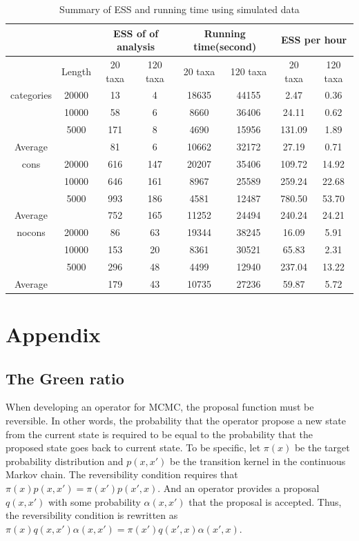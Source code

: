 \documentclass{bmcart}
\begin{document}
\begin{backmatter}
\begin{table}[h!]
  \centering
\begin{tabular}{cc|cc|cc|cc}
\hline
&&\multicolumn{2}{c|}{ESS of of analysis}&\multicolumn{2}{c|}{Running time(second)}&\multicolumn{2}{c}{ESS per hour}\\
\hline
&Length&20 taxa&120 taxa&20 taxa&120 taxa&20 taxa&120 taxa\\
categories&20000&13&4&18635&44155&2.47&0.36\\
&10000&58&6&8660&36406&24.11&0.62\\
&5000&171&8&4690&15956&131.09&1.89\\
Average&&81&6&10662&32172&27.19&0.71\\
\hline
cons&20000&616&147&20207&35406&109.72&14.92\\
&10000&646&161&8967&25589&259.24&22.68\\
&5000&993&186&4581&12487&780.50&53.70\\
Average&&752&165&11252&24494&240.24&24.21\\
\hline
nocons&20000&86&63&19344&38245&16.09&5.91\\
&10000&153&20&8361&30521&65.83&2.31\\
&5000&296&48&4499&12940&237.04&13.22\\
Average&&179&43&10735&27236&59.87&5.72\\
\hline
\end{tabular}
\caption{Summary of ESS and running time using simulated data}\label{eff_comp1}
\end{table}
\clearpage
\newpage
\section*{Appendix}
\subsection*{The Green ratio}
When developing an operator for MCMC, the proposal function must be reversible. In other words, the probability that the operator propose a new state from the current state is required to be equal to the probability that the proposed state goes back to current state. To be specific, let ${\pi (x)}$ be the target probability distribution and $p(x, x')$ be the transition kernel in the continuous Markov chain. The reversibility condition requires that ${\pi (x)}{p(x, x')} = {\pi (x')}{p(x', x)}$. And an operator provides a proposal $q(x, x')$ with some probability $\alpha(x, x')$ that the proposal is accepted. Thus, the reversibility condition is rewritten as ${\pi (x)}{q(x, x')}{\alpha(x, x')} = {\pi (x')}{q(x', x)}{\alpha(x', x)}$.


\end{backmatter}
\end{document}
